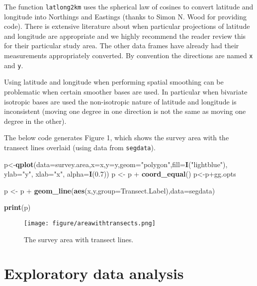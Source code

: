 \documentclass[]{article}
\newenvironment{Shaded}{}{}
\newcommand{\KeywordTok}[1]{\textcolor[rgb]{0.00,0.44,0.13}{\textbf{{#1}}}}
\newcommand{\DataTypeTok}[1]{\textcolor[rgb]{0.56,0.13,0.00}{{#1}}}
\newcommand{\FloatTok}[1]{\textcolor[rgb]{0.25,0.63,0.44}{{#1}}}
\newcommand{\StringTok}[1]{\textcolor[rgb]{0.25,0.44,0.63}{{#1}}}
\newcommand{\NormalTok}[1]{{#1}}
\begin{document}
The function \texttt{latlong2km} uses the spherical law of cosines to
convert latitude and longitude into Northings and Eastings (thanks to
Simon N. Wood for providing code). There is extensive literature about
when particular projections of latitude and longitude are appropriate
and we highly recommend the reader review this for their particular
study area. The other data frames have already had their measurements
appropriately converted. By convention the directions are named
\texttt{x} and \texttt{y}.

Using latitude and longitude when performing spatial smoothing can be
problematic when certain smoother bases are used. In particular when
bivariate isotropic bases are used the non-isotropic nature of latitude
and longitude is inconsistent (moving one degree in one direction is not
the same as moving one degree in the other).

The below code generates Figure 1, which shows the survey area with the
transect lines overlaid (using data from \texttt{segdata}).

\begin{Shaded}
\begin{Highlighting}[]
\NormalTok{p<-}\KeywordTok{qplot}\NormalTok{(}\DataTypeTok{data=}\NormalTok{survey.area,}\DataTypeTok{x=}\NormalTok{x,}\DataTypeTok{y=}\NormalTok{y,}\DataTypeTok{geom=}\StringTok{"polygon"}\NormalTok{,}\DataTypeTok{fill=}\KeywordTok{I}\NormalTok{(}\StringTok{"lightblue"}\NormalTok{),}
\DataTypeTok{ylab=}\StringTok{"y"}\NormalTok{, }\DataTypeTok{xlab=}\StringTok{"x"}\NormalTok{, }\DataTypeTok{alpha=}\KeywordTok{I}\NormalTok{(}\FloatTok{0.7}\NormalTok{))}
\NormalTok{p <-}\StringTok{ }\NormalTok{p +}\StringTok{ }\KeywordTok{coord_equal}\NormalTok{()}
\NormalTok{p<-p+gg.opts}

\NormalTok{p <-}\StringTok{ }\NormalTok{p +}\StringTok{ }\KeywordTok{geom_line}\NormalTok{(}\KeywordTok{aes}\NormalTok{(x,y,}\DataTypeTok{group=}\NormalTok{Transect.Label),}\DataTypeTok{data=}\NormalTok{segdata)}

\KeywordTok{print}\NormalTok{(p)}
\end{Highlighting}
\end{Shaded}

\begin{figure}[htbp]
\centering
\texttt{[image: figure/areawithtransects.png]}
\caption{The survey area with transect lines.}
\end{figure}

\section{Exploratory data analysis}\label{exploratory-data-analysis}
\end{document}
